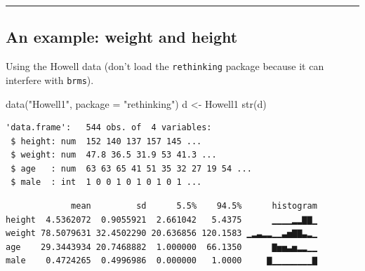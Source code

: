 \documentclass[
  letterpaper,
  DIV=11,
  numbers=noendperiod]{scrartcl}
\newenvironment{Shaded}{\begin{snugshade}}{\end{snugshade}}
\newcommand{\AttributeTok}[1]{\textcolor[rgb]{0.40,0.45,0.13}{#1}}
\newcommand{\FunctionTok}[1]{\textcolor[rgb]{0.28,0.35,0.67}{#1}}
\newcommand{\NormalTok}[1]{\textcolor[rgb]{0.00,0.23,0.31}{#1}}
\newcommand{\OtherTok}[1]{\textcolor[rgb]{0.00,0.23,0.31}{#1}}
\newcommand{\SpecialCharTok}[1]{\textcolor[rgb]{0.37,0.37,0.37}{#1}}
\newcommand{\StringTok}[1]{\textcolor[rgb]{0.13,0.47,0.30}{#1}}
\begin{document}
\begin{center}\rule{0.5\linewidth}{0.5pt}\end{center}

\subsection{An example: weight and
height}\label{an-example-weight-and-height}

Using the Howell data (don't load the \texttt{rethinking} package
because it can interfere with \texttt{brms}).

\begin{Shaded}
\begin{Highlighting}[]
\FunctionTok{data}\NormalTok{(}\StringTok{"Howell1"}\NormalTok{, }\AttributeTok{package =} \StringTok{"rethinking"}\NormalTok{)}
\NormalTok{d }\OtherTok{\textless{}{-}}\NormalTok{ Howell1}
\FunctionTok{str}\NormalTok{(d)}
\end{Highlighting}
\end{Shaded}

\begin{verbatim}
'data.frame':   544 obs. of  4 variables:
 $ height: num  152 140 137 157 145 ...
 $ weight: num  47.8 36.5 31.9 53 41.3 ...
 $ age   : num  63 63 65 41 51 35 32 27 19 54 ...
 $ male  : int  1 0 0 1 0 1 0 1 0 1 ...
\end{verbatim}

\begin{Shaded}
\end{Shaded}

\begin{verbatim}
             mean         sd      5.5%    94.5%      histogram
height  4.5362072  0.9055921  2.661042   5.4375      ▁▁▁▁▂▂▇▇▁
weight 78.5079631 32.4502290 20.636856 120.1583 ▁▂▃▂▂▁▁▃▅▇▇▃▂▁
age    29.3443934 20.7468882  1.000000  66.1350      ▇▅▅▃▅▂▂▁▁
male    0.4724265  0.4996986  0.000000   1.0000     ▇▁▁▁▁▁▁▁▁▇
\end{verbatim}
\end{document}
